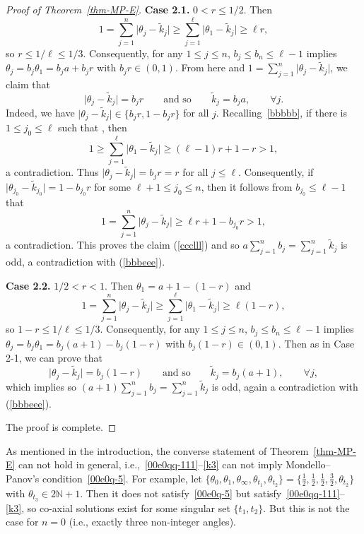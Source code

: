 \documentclass[pdftex]{sigma}
\numberwithin{equation}{section}
\begin{document}
\begin{proof}[Proof of Theorem~\ref{thm-MP-E}]
{\bf Case 2.1.} $0<r\leq 1/2$. Then
\[1=\sum_{j=1}^n\bigl|\theta_j-\tilde{k}_j\bigr|\geq \sum_{j=1}^\ell\bigl|\theta_1-\tilde{k}_j\bigr|\geq \ell r,\]
so $r\leq 1/\ell\leq 1/3$.
Consequently, for any $1\leq j\leq n$, $b_j\leq b_n\leq \ell-1$ implies
$\theta_j=b_j\theta_1=b_j a+ b_j r$ with $b_j r\in (0,1)$. From here and $1=\sum_{j=1}^n\bigl|\theta_j-\tilde{k}_j\bigr|$, we claim that
\begin{equation} \label{ccclll}
 \bigl|\theta_j-\tilde{k}_j\bigr|=b_jr\qquad\text{and so}\qquad \tilde{k}_j=b_j a,\qquad\forall j.
\end{equation}
Indeed,
we have $\bigl|\theta_j-\tilde{k}_j\bigr|\in \{b_jr, 1-b_jr\}$ for all $j$. Recalling~\eqref{bbbbb}, if there is $1\leq j_0\leq \ell$ such that , then
\[1\geq \sum_{j=1}^\ell\bigl|\theta_1-\tilde{k}_j\bigr|\geq (\ell-1)r+1-r>1,\]
a contradiction. Thus $\bigl|\theta_j-\tilde{k}_j\bigr|=b_jr =r$ for all $j\leq \ell$. Consequently, if $\bigl|\theta_{j_0}-\tilde{k}_{j_0}\bigr|=1-b_{j_0}r$ for some $\ell+1\leq j_0\leq n$, then it follows from $b_{j_0}\leq \ell-1$ that
\[1=\sum_{j=1}^n\bigl|\theta_j-\tilde{k}_j\bigr|\geq \ell r+1-b_{j_0}r>1,\]
a contradiction. This proves the claim (\ref{ccclll}) and so $a\sum_{j=1}^n b_j=\sum_{j=1}^n \tilde{k}_j$ is odd, a contradiction with (\ref{bbbeee}).

{\bf Case 2.2.} $1/2<r<1$. Then $\theta_1=a+1-(1-r)$
and
\[1=\sum_{j=1}^n\bigl|\theta_j-\tilde{k}_j\bigr|\geq \sum_{j=1}^\ell\bigl|\theta_1-\tilde{k}_j\bigr|\geq \ell (1-r),\]
so $1-r\leq 1/\ell\leq 1/3$. Consequently, for any $1\leq j\leq n$, $b_j\leq b_n\leq \ell-1$ implies
$\theta_j=b_j\theta_1=b_j (a+1)-b_j(1-r)$ with $b_j (1-r)\in (0,1)$. Then as in Case 2-1, we can prove that
\[
 \bigl|\theta_j-\tilde{k}_j\bigr|=b_j(1-r)\qquad\text{and so}\qquad \tilde{k}_j=b_j (a+1),\qquad\forall j,
\]
which implies so $(a+1)\sum_{j=1}^n b_j=\sum_{j=1}^n \tilde{k}_j$ is odd, again a contradiction with (\ref{bbbeee}).

The proof is complete.
\end{proof}

As mentioned in the introduction, the converse statement of Theorem~\ref{thm-MP-E} can not hold in general,
i.e.,~\eqref{00e0qq-111}--\eqref{k3} can not imply Mondello--Panov's
condition~\eqref{00e0q-5}. For example, let
$\{\theta_0,\theta_1,\theta_\infty,\theta_{t_1},\allowbreak\theta_{t_2}\}=\bigl\{\frac12,\frac12,\frac12,\frac32,\theta_{t_2}\bigr\}$
with $\theta_{t_3}\in 2\mathbb{N}+1$. Then it does not satisfy~\eqref{00e0q-5} but satisfy~\eqref{00e0qq-111}--\eqref{k3}, so co-axial solutions exist for some singular set $\{t_1, t_2\}$.
But this is not the case for $n=0$ (i.e., exactly three non-integer angles).
\end{document}
